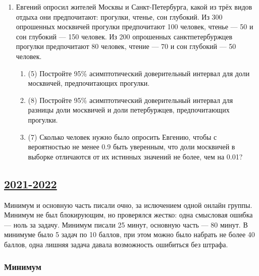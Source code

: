 \begin{enumerate}
  \item Евгений опросил жителей Москвы и Санкт-Петербурга, 
  какой из трёх видов отдыха они предпочитают: прогулки, чтенье, сон глубокий. 
  Из 300 опрошенных москвичей прогулки предпочитают 100 человек, чтенье — 50 и сон глубокий — 150 человек. Из 200 опрошенных санктпетербуржцев прогулки предпочитают 80 человек, 
  чтение — 70 и сон глубокий — 50 человек.
  
  \begin{enumerate}
  \item (5) Постройте 95\% асимптотический доверительный интервал для доли москвичей, предпочитающих прогулки.
  \item (8) Постройте 95\% асимптотический доверительный интервал для разницы доли москвичей и доли петербуржцев, предпочитающих прогулки.
  \item (7) Сколько человек нужно было опросить Евгению, чтобы с вероятностью не менее 0.9 быть уверенным, что доли москвичей в выборке отличаются от их истинных значений не более, чем на 0.01?
  \end{enumerate}
  
\end{enumerate}


\subsection[2021-2022]{\hyperref[sec:sol_kr_03_2021_2022]{2021-2022}}
\label{sec:kr_03_2021_2022}

Минимум и основную часть писали очно, за ислючением одной онлайн группы.
Минимум не был блокирующим, но проверялся жестко: одна смысловая ошибка — ноль за задачу.
Минимум писали 25 минут, основную часть — 80 минут. 
В минимуме было 5 задач по 10 баллов, при этом можно было набрать не более 40 баллов, 
одна лишняя задача давала возможность ошибиться без штрафа.

\subsubsection*{Минимум}


